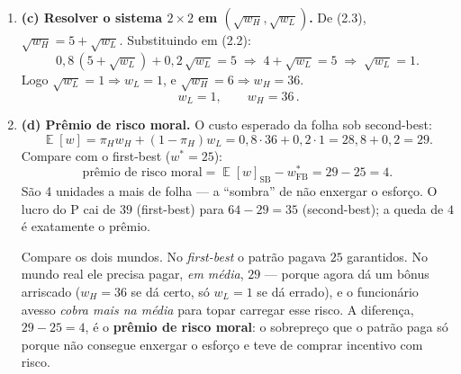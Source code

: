 \documentclass[11pt,a4paper]{article}
\DeclareMathOperator{\Esp}{\mathbb{E}}
\newcommand{\dc}[2]{#1{,}#2}
\begin{document}
\begin{enumerate}[leftmargin=2em,itemsep=4pt]
\begin{empalavras}
\smallskip\noindent
\textbf{Por que as duas ficam binding (com igualdade)?} Intuição de patrão sovina: ele
nunca dá nada de graça. (i) Se a IR sobrasse (funcionário satisfeito \emph{além} do
necessário), o patrão cortaria salário até encostar em $\bar U$ — logo IR vira igualdade.
(ii) Se a IC sobrasse (funcionário esforçando-se com folga de incentivo), o patrão
\emph{encolheria o bônus} ($w_H - w_L$), o que reduz o risco imposto ao funcionário avesso e
\emph{barateia} a folha — até a IC encostar na igualdade. Como mexer em cada uma sempre
reduz custo até o limite, no ótimo \textbf{ambas valem com $=$}. É por isso que trocamos os
$\ge$ por $=$ nas contas a seguir.
\end{empalavras}

\[
\text{(IR)}\quad \dc{0}{8}\sqrt{w_H} + \dc{0}{2}\sqrt{w_L} = 3 + 2 = 5, \tag{2.2}
\]
\[
\text{(IC)}\quad (\dc{0}{8} - \dc{0}{4})\big[\sqrt{w_H} - \sqrt{w_L}\big] = 2
\;\Longrightarrow\; \dc{0}{4}\big[\sqrt{w_H}-\sqrt{w_L}\big] = 2
\;\Longrightarrow\; \sqrt{w_H} - \sqrt{w_L} = 5. \tag{2.3}
\]

\item \textbf{(c) Resolver o sistema $2\times2$ em $(\sqrt{w_H},\sqrt{w_L})$.} De (2.3),
$\sqrt{w_H} = 5 + \sqrt{w_L}$. Substituindo em (2.2):
\[
\dc{0}{8}\,(5 + \sqrt{w_L}) + \dc{0}{2}\,\sqrt{w_L} = 5
\;\Longrightarrow\; 4 + \sqrt{w_L} = 5
\;\Longrightarrow\; \sqrt{w_L} = 1.
\]
Logo $\sqrt{w_L}=1 \Rightarrow w_L = 1$, e $\sqrt{w_H} = 6 \Rightarrow w_H = 36$.
\[
\boxed{\,w_L = 1, \qquad w_H = 36\,}. \tag{2.4}
\]

\item \textbf{(d) Prêmio de risco moral.} O custo esperado da folha sob second-best:
\[
\Esp[w] = \pi_H w_H + (1-\pi_H) w_L = \dc{0}{8}\cdot 36 + \dc{0}{2}\cdot 1
= \dc{28}{8} + \dc{0}{2} = 29.
\]
Compare com o first-best ($w^\ast = 25$):
\[
\boxed{\;\text{prêmio de risco moral} = \Esp[w]_{\text{SB}} - w^\ast_{\text{FB}}
= 29 - 25 = 4.\;} \tag{2.5}
\]
São 4 unidades a mais de folha — a ``sombra'' de não enxergar o esforço. O lucro do P cai
de $39$ (first-best) para $64 - 29 = 35$ (second-best); a queda de $4$ é exatamente o
prêmio.

\begin{empalavras}[O que significa ``prêmio de risco moral'' = 4]
Compare os dois mundos. No \emph{first-best} o patrão pagava $25$ garantidos. No mundo real
ele precisa pagar, \emph{em média}, $29$ — porque agora dá um bônus arriscado ($w_H = 36$ se
dá certo, só $w_L = 1$ se dá errado), e o funcionário avesso \emph{cobra mais na média} para
topar carregar esse risco. A diferença, $29 - 25 = 4$, é o \textbf{prêmio de risco moral}:
o sobrepreço que o patrão paga só porque não consegue enxergar o esforço e teve de comprar
incentivo com risco.


\end{empalavras}
\end{enumerate}
\end{document}
